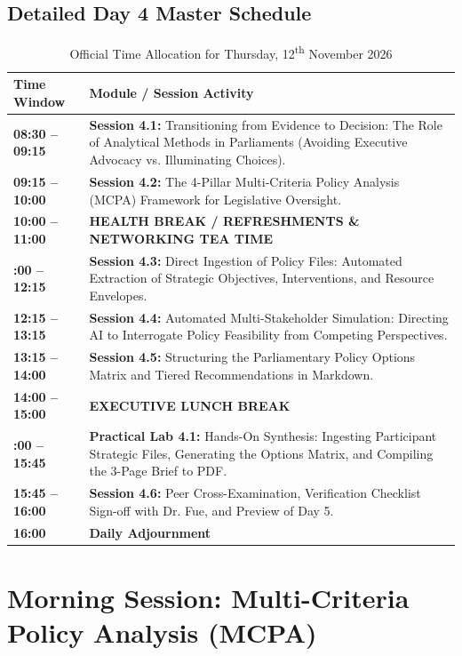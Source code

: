 \documentclass[11pt, a4paper]{report}
\begin{document}
\section{Detailed Day 4 Master Schedule}
\begin{table}[htbp]
\centering
\caption{Official Time Allocation for Thursday, 12\textsuperscript{th} November 2026}
\vspace{0.2cm}
\begin{tabular}{@{}>{\bfseries}lp{11.5cm}@{}}
\toprule
Time Window & Module / Session Activity \\
\midrule
08:30 -- 09:15 & \textbf{Session 4.1:} Transitioning from Evidence to Decision: The Role of Analytical Methods in Parliaments (Avoiding Executive Advocacy vs. Illuminating Choices). \\
09:15 -- 10:00 & \textbf{Session 4.2:} The 4-Pillar Multi-Criteria Policy Analysis (MCPA) Framework for Legislative Oversight. \\
\addlinespace
\textbf{10:00 -- 11:00} & \textbf{HEALTH BREAK / REFRESHMENTS \& NETWORKING TEA TIME} \\
\addlinespace
11:00 -- 12:15 & \textbf{Session 4.3:} Direct Ingestion of Policy Files: Automated Extraction of Strategic Objectives, Interventions, and Resource Envelopes. \\
12:15 -- 13:15 & \textbf{Session 4.4:} Automated Multi-Stakeholder Simulation: Directing AI to Interrogate Policy Feasibility from Competing Perspectives. \\
13:15 -- 14:00 & \textbf{Session 4.5:} Structuring the Parliamentary Policy Options Matrix and Tiered Recommendations in Markdown. \\
\addlinespace
\textbf{14:00 -- 15:00} & \textbf{EXECUTIVE LUNCH BREAK} \\
\addlinespace
15:00 -- 15:45 & \textbf{Practical Lab 4.1:} Hands-On Synthesis: Ingesting Participant Strategic Files, Generating the Options Matrix, and Compiling the 3-Page Brief to PDF. \\
15:45 -- 16:00 & \textbf{Session 4.6:} Peer Cross-Examination, Verification Checklist Sign-off with Dr. Fue, and Preview of Day 5. \\
\textbf{16:00} & \textbf{Daily Adjournment} \\
\bottomrule
\end{tabular}
\end{table}

\newpage

\chapter{Morning Session: Multi-Criteria Policy Analysis (MCPA)}
\end{document}
